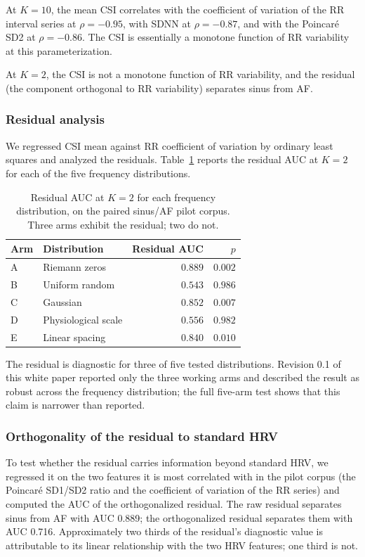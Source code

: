 \documentclass[11pt]{article}
\begin{document}
At $K = 10$, the mean CSI correlates with the coefficient of variation
of the RR interval series at $\rho = -0.95$, with SDNN at
$\rho = -0.87$, and with the Poincar\'e SD2 at $\rho = -0.86$. The CSI
is essentially a monotone function of RR variability at this
parameterization.

At $K = 2$, the CSI is not a monotone function of RR variability, and
the residual (the component orthogonal to RR variability) separates
sinus from AF.

\subsubsection{Residual analysis}

We regressed CSI mean against RR coefficient of variation by ordinary
least squares and analyzed the residuals. Table~\ref{tab:residual-wp}
reports the residual AUC at $K = 2$ for each of the five frequency
distributions.

\begin{table}[h]
\centering
\begin{tabular}{llrr}
\toprule
Arm & Distribution & Residual AUC & $p$ \\
\midrule
A & Riemann zeros & $0.889$ & $0.002$ \\
B & Uniform random & $0.543$ & $0.986$ \\
C & Gaussian & $0.852$ & $0.007$ \\
D & Physiological scale & $0.556$ & $0.982$ \\
E & Linear spacing & $0.840$ & $0.010$ \\
\bottomrule
\end{tabular}
\caption{Residual AUC at $K = 2$ for each frequency distribution, on
the paired sinus/AF pilot corpus. Three arms exhibit the residual; two
do not.}
\label{tab:residual-wp}
\end{table}

The residual is diagnostic for three of five tested distributions.
Revision 0.1 of this white paper reported only the three working arms
and described the result as robust across the frequency distribution;
the full five-arm test shows that this claim is narrower than
reported.

\subsubsection{Orthogonality of the residual to standard HRV}

To test whether the residual carries information beyond standard HRV,
we regressed it on the two features it is most correlated with in the
pilot corpus (the Poincar\'e SD1/SD2 ratio and the coefficient of
variation of the RR series) and computed the AUC of the
orthogonalized residual. The raw residual separates sinus from AF with
AUC 0.889; the orthogonalized residual separates them with AUC 0.716.
Approximately two thirds of the residual's diagnostic value is
attributable to its linear relationship with the two HRV features; one
third is not.
\end{document}
